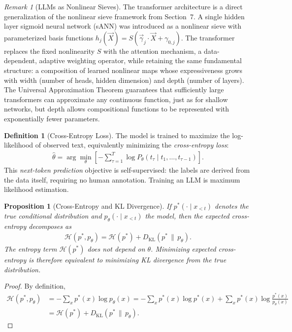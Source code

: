 \documentclass[11pt]{article}
\theoremstyle{definition}
\newtheorem{definition}{Definition}[section]
\theoremstyle{plain}
\newtheorem{proposition}{Proposition}[section]
\theoremstyle{remark}
\newtheorem{remark}{Remark}[section]
\begin{document}
\begin{remark}[LLMs as Nonlinear Sieves]
    The transformer architecture is a direct generalization of the nonlinear sieve framework from Section~7. A single hidden layer sigmoid neural network (sANN) was introduced as a nonlinear sieve with parameterized basis functions $h_j(\vec{X}) = S(\vec{\gamma}_j\cdot\vec{X} + \gamma_{0,j})$. The transformer replaces the fixed nonlinearity $S$ with the attention mechanism, a data-dependent, adaptive weighting operator, while retaining the same fundamental structure: a composition of learned nonlinear maps whose expressiveness grows with width (number of heads, hidden dimension) and depth (number of layers). The Universal Approximation Theorem guarantees that sufficiently large transformers can approximate any continuous function, just as for shallow networks, but depth allows compositional functions to be represented with exponentially fewer parameters.
\end{remark}

\begin{definition}[Cross-Entropy Loss]
    The model is trained to maximize the log-likelihood of observed text, equivalently minimizing the \emph{cross-entropy loss}:
    \begin{align}
        \hat{\theta} = \arg\min_\theta \left[-\sum_{\tau=1}^T \log P_\theta(t_\tau \mid t_1, \dots, t_{\tau-1})\right].
    \end{align}
    This \emph{next-token prediction} objective is self-supervised: the labels are derived from the data itself, requiring no human annotation. Training an LLM is maximum likelihood estimation.
\end{definition}

\begin{proposition}[Cross-Entropy and KL Divergence]
    If $p^*(\cdot \mid x_{<t})$ denotes the true conditional distribution and $p_\theta(\cdot \mid x_{<t})$ the model, then the expected cross-entropy decomposes as
    \begin{align}
        \mathcal{H}(p^*, p_\theta) = \mathcal{H}(p^*) + D_{\mathrm{KL}}(p^* \,\|\, p_\theta).
    \end{align}
    The entropy term $\mathcal{H}(p^*)$ does not depend on $\theta$. Minimizing expected cross-entropy is therefore equivalent to minimizing KL divergence from the true distribution.
\end{proposition}
\begin{proof}
    By definition,
    \begin{align}
        \mathcal{H}(p^*, p_\theta) &= -\sum_x p^*(x) \log p_\theta(x)
        = -\sum_x p^*(x) \log p^*(x) + \sum_x p^*(x) \log \frac{p^*(x)}{p_\theta(x)}\\
        &= \mathcal{H}(p^*) + D_{\mathrm{KL}}(p^* \,\|\, p_\theta).
    \end{align}
\end{proof}
\end{document}
